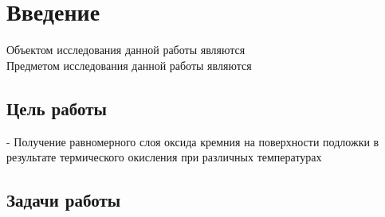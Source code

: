 \section{Введение}

Объектом исследования данной работы являются \\


Предметом исследования данной работы являются \\


\subsection*{Цель работы}

- Получение равномерного слоя оксида кремния на поверхности подложки в результате термического окисления при различных температурах

\subsection*{Задачи работы}






\pagebreak
